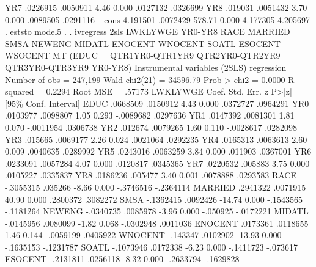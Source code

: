          YR7 {\VBAR}   .0226915   .0050911     4.46   0.000     .0127132    .0326699
         YR8 {\VBAR}    .019031   .0051432     3.70   0.000     .0089505    .0291116
       _cons {\VBAR}   4.191501   .0072429   578.71   0.000     4.177305    4.205697
{\smallskip}
. eststo model5
{\smallskip}
. 
. ivregress 2sls LWKLYWGE YR0-YR8 RACE MARRIED SMSA NEWENG MIDATL ENOCENT WNOCENT SOATL ESOCENT WSOCENT MT  (EDUC = QTR1YR0-QTR1YR9 QTR2YR0-QTR2YR9 QTR3YR0-QTR3YR9 YR0-YR8)
{\smallskip}
Instrumental variables (2SLS) regression          Number of obs   =    247,199
                                                  Wald chi2(21)   =   34596.79
                                                  Prob > chi2     =     0.0000
                                                  R-squared       =     0.2294
                                                  Root MSE        =     .57173
{\smallskip}
    LWKLYWGE {\VBAR}      Coef.   Std. Err.      z    P>|z|     [95\% Conf. Interval]
        EDUC {\VBAR}   .0668509   .0150912     4.43   0.000     .0372727    .0964291
         YR0 {\VBAR}   .0103977   .0098807     1.05   0.293    -.0089682    .0297636
         YR1 {\VBAR}   .0147392   .0081301     1.81   0.070    -.0011954    .0306738
         YR2 {\VBAR}    .012674   .0079265     1.60   0.110    -.0028617    .0282098
         YR3 {\VBAR}    .015665   .0069177     2.26   0.024     .0021064    .0292235
         YR4 {\VBAR}   .0165313   .0063613     2.60   0.009     .0040635    .0289992
         YR5 {\VBAR}   .0243016   .0063259     3.84   0.000      .011903    .0367001
         YR6 {\VBAR}   .0233091   .0057284     4.07   0.000     .0120817    .0345365
         YR7 {\VBAR}   .0220532    .005883     3.75   0.000     .0105227    .0335837
         YR8 {\VBAR}   .0186236    .005477     3.40   0.001     .0078888    .0293583
        RACE {\VBAR}  -.3055315    .035266    -8.66   0.000    -.3746516   -.2364114
     MARRIED {\VBAR}   .2941322   .0071915    40.90   0.000     .2800372    .3082272
        SMSA {\VBAR}  -.1362415   .0092426   -14.74   0.000    -.1543565   -.1181264
      NEWENG {\VBAR}  -.0340735   .0085978    -3.96   0.000     -.050925   -.0172221
      MIDATL {\VBAR}  -.0145956   .0080099    -1.82   0.068    -.0302948    .0011036
     ENOCENT {\VBAR}   .0173361   .0118655     1.46   0.144    -.0059199    .0405922
     WNOCENT {\VBAR}   -.143347   .0102902   -13.93   0.000    -.1635153   -.1231787
       SOATL {\VBAR}  -.1073946   .0172338    -6.23   0.000    -.1411723    -.073617
     ESOCENT {\VBAR}  -.2131811   .0256118    -8.32   0.000    -.2633794   -.1629828
